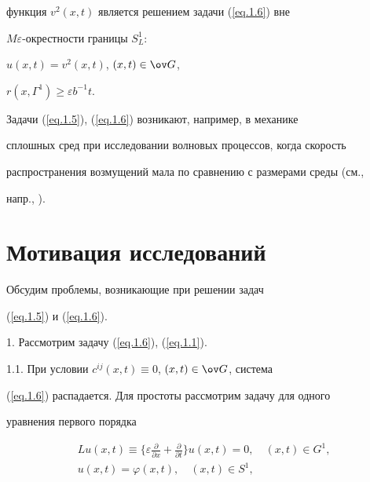 функция $v^2(x, t)$ является решением задачи (\ref{eq.1.6}) вне


$M\varepsilon$-окрестности границы $S^1_L$:


$u(x, t)=v^2(x, t)$, $(x, t)\in \ov G$,


$r(x, \varGamma^1)\ge \varepsilon b^{-1} t$.





Задачи (\ref{eq.1.5}), (\ref{eq.1.6}) возникают, например, в механике


сплошных сред при исследовании волновых процессов, когда скорость


распространения возмущений мала по сравнению с размерами среды (см.,


напр., \cite{12}).





\section{Мотивация исследований}


\label{section.2}





Обсудим проблемы, возникающие при решении задач


(\ref{eq.1.5}) и (\ref{eq.1.6}).





1. Рассмотрим задачу (\ref{eq.1.6}), (\ref{eq.1.1}).





1.1. При условии $c^{ij}(x, t)\equiv 0$, $(x, t)\in \ov G$, система


(\ref{eq.1.6}) распадается. Для простоты рассмотрим задачу для одного


уравнения первого порядка


\begin{equation} \label{eq.2.1}


\begin{array}{c}


\displaystyle


L u(x,t)\equiv \bigg\{\varepsilon \frac{\partial}{\partial x}


+\frac{\partial}{\partial t}\bigg\}


u(x,t)=0, \quad (x, t)\in G^1,\\[3mm]


u(x, t)=\varphi(x, t), \quad (x, t)\in S^1,


\end{array}


\end{equation}


